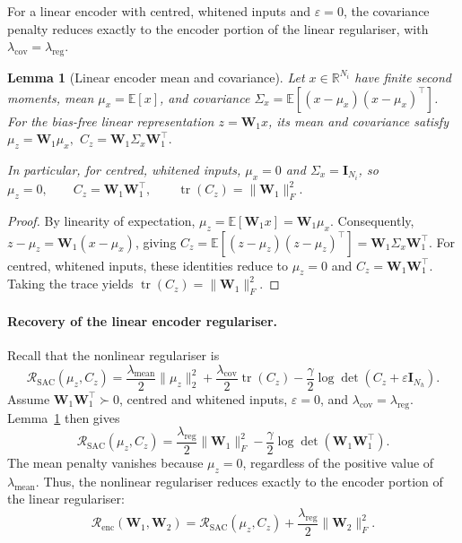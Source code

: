 \documentclass{article} %
\newcommand{\wa}{\mathbf{W}_1}
\newcommand{\wb}{\mathbf{W}_2}
\newtheorem{lemma}[theorem]{Lemma}
\theoremstyle{remark}
\begin{document}

For a linear encoder with centred, whitened inputs and $\varepsilon=0$, the covariance penalty reduces exactly to the encoder portion of the linear regulariser, with $\lambda_{\mathrm{cov}}=\lambda_{\mathrm{reg}}$. 

\begin{lemma}[Linear encoder mean and covariance]
\label{lem:linear-gram-covariance}
Let $x\in\mathbb{R}^{N_i}$ have finite second moments, mean
$\mu_x=\mathbb{E}[x]$, and covariance
$\Sigma_x=\mathbb{E}[(x-\mu_x)(x-\mu_x)^\top]$.
For the bias-free linear representation $z=\wa x$, its mean
and covariance satisfy $\mu_z=\wa\mu_x, $
\text{}$
C_z=\wa\Sigma_x\wa^\top.$

In particular, for centred, whitened inputs,
$\mu_x=0$ and $\Sigma_x=\mathbf{I}_{N_i}$, so $\mu_z=0,
\qquad
C_z=\wa\wa^\top,
\qquad
\operatorname{tr}(C_z)=\|\wa\|_F^2.$
\end{lemma}

\begin{proof}
By linearity of expectation, $\mu_z=\mathbb{E}[\wa x]=\wa\mu_x.$
Consequently, $z-\mu_z=\wa(x-\mu_x)$, giving $C_z
=
\mathbb{E}[(z-\mu_z)(z-\mu_z)^\top]
=
\wa\Sigma_x\wa^\top.$
For centred, whitened inputs, these identities reduce to
$\mu_z=0$ and $C_z=\wa\wa^\top$. Taking the trace yields
$\operatorname{tr}(C_z)=\|\wa\|_F^2$.
\end{proof}

\paragraph{Recovery of the linear encoder regulariser.}
Recall that the nonlinear regulariser is
\[
\mathcal{R}_{\mathrm{SAC}}(\mu_z,C_z)
=
\frac{\lambda_{\mathrm{mean}}}{2}\|\mu_z\|_2^2
+
\frac{\lambda_{\mathrm{cov}}}{2}\operatorname{tr}(C_z)
-
\frac{\gamma}{2}
\log\det(C_z+\varepsilon\mathbf{I}_{N_h}).
\]
Assume $\wa\wa^\top\succ0$, centred and whitened inputs,
$\varepsilon=0$, and
$\lambda_{\mathrm{cov}}=\lambda_{\mathrm{reg}}$.
Lemma~\ref{lem:linear-gram-covariance} then gives
\[
\mathcal{R}_{\mathrm{SAC}}(\mu_z,C_z)
=
\frac{\lambda_{\mathrm{reg}}}{2}\|\wa\|_F^2
-
\frac{\gamma}{2}\log\det(\wa\wa^\top).
\]
The mean penalty vanishes because $\mu_z=0$, regardless of the
positive value of $\lambda_{\mathrm{mean}}$.
Thus, the nonlinear regulariser reduces exactly to the encoder
portion of the linear regulariser:
\[
\mathcal{R}_{\mathrm{enc}}(\wa,\wb)
=
\mathcal{R}_{\mathrm{SAC}}(\mu_z,C_z)
+
\frac{\lambda_{\mathrm{reg}}}{2}\|\wb\|_F^2.
\]
\end{document}
